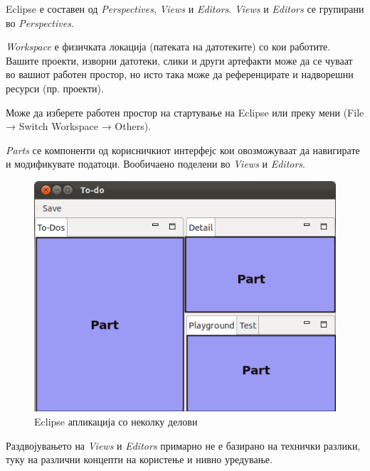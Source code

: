 Eclipse е составен од \emph{Perspectives}, \emph{Views} и \emph{Editors}.
\emph{Views} и \emph{Editors} се групирани во \emph{Perspectives}.


\emph{Workspace} е физичката локација (патеката на датотеките) со кои работите.
Вашите проекти, изворни датотеки, слики и други артефакти може да се чуваат во
вашиот работен простор, но исто така може да референцирате и надворешни ресурси
(пр. проекти). 

Може да изберете работен простор на стартување на Eclipse или преку мени (File →
Switch Workspace → Others).


\emph{Parts} се компоненти од корисничкиот интерфејс кои овозможуваат да
навигирате и модификувате податоци. Вообичаено поделени во \emph{Views} и
\emph{Editors}.

\begin{figure}
\centering
\includegraphics[scale=.5]{images/parts}
\caption{Eclipse апликација со неколку делови}
\end{figure}

Раздвојувањето на \emph{Views} и \emph{Editors} примарно не е базирано на
технички разлики, туку на различни концепти на користење и нивно уредување.

